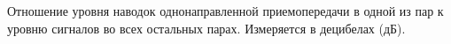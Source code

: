 Отношение уровня наводок однонаправленной
приемопередачи в одной из пар к уровню сигналов во всех 
остальных парах. Измеряется в децибелах (дБ).